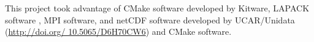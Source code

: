 This project took advantage of CMake software developed by Kitware, LAPACK software \cite{Anderson99}, MPI software, and netCDF software developed by UCAR/Unidata (\href{http://doi.org/10.5065/D6H70CW6}{http://doi.org/ 10.5065/D6H70CW6}) and CMake software. 